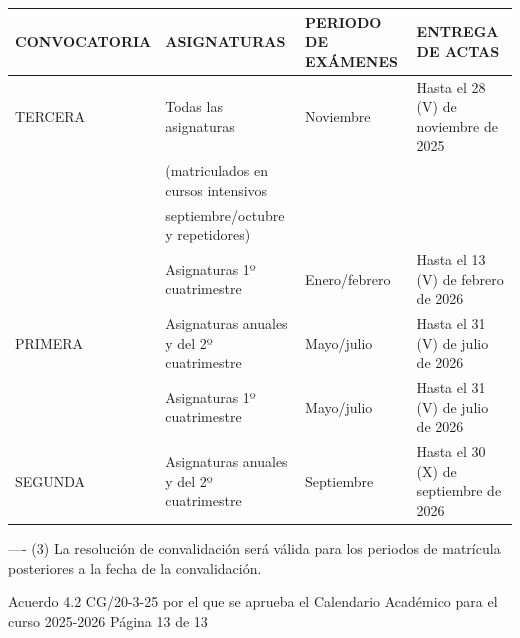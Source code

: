 \documentclass{article}
\begin{document}
\begin{itemize}
\begin{itemize}
\begin{scriptsize}
                  \vspace{0.4cm}
                  \begin{table}[h!]\centering\renewcommand{\arraystretch}{1.3}
                    \begin{tabular}{|p{}|p{}|p{}|p{}|}\hline
                      CONVOCATORIA & ASIGNATURAS                               & PERIODO DE EXÁMENES & ENTREGA DE ACTAS                      \\\hline
                      TERCERA      & Todas las asignaturas                     & Noviembre           & Hasta el 28 (V) de noviembre de 2025  \\\hline
                                   & (matriculados en cursos intensivos        &                     &                                       \\\hline
                                   & septiembre/octubre y repetidores)         &                     &                                       \\\hline
                                   & Asignaturas 1º cuatrimestre               & Enero/febrero       & Hasta el 13 (V) de febrero de 2026    \\\hline
                      PRIMERA      & Asignaturas anuales y del 2º cuatrimestre & Mayo/julio          & Hasta el 31 (V) de julio de 2026      \\\hline
                                   & Asignaturas 1º cuatrimestre               & Mayo/julio          & Hasta el 31 (V) de julio de 2026      \\\hline
                      SEGUNDA      & Asignaturas anuales y del 2º cuatrimestre & Septiembre          & Hasta el 30 (X) de septiembre de 2026 \\\hline
                    \end{tabular}\end{table}
                  \vspace{0.4cm}

                  ----
                  (3) La resolución de convalidación será válida para los periodos de matrícula posteriores a la fecha de la convalidación.

                  Acuerdo 4.2 CG/20-3-25 por el que se aprueba el Calendario Académico para el curso 2025-2026      Página 13 de 13
                \end{scriptsize}
        \end{itemize}



\end{itemize}
\end{document}
